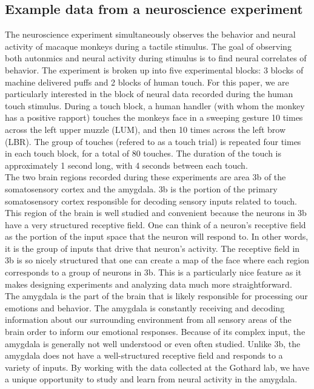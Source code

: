 \documentclass[12pt]{article}
\begin{document}
\subsection{Example data from a neuroscience experiment}The neuroscience experiment simultaneously observes the behavior and neural activity of macaque monkeys during a tactile stimulus. The goal of observing both autonmics and neural activity during stimulus is to find neural correlates of behavior. The experiment is broken up into five experimental blocks: 3 blocks of machine delivered puffs and 2 blocks of human touch. For this paper, we are particularly interested in the block of neural data recorded during the human touch stimulus. During a touch block, a human handler (with whom the monkey has a positive rapport) touches the monkeys face in a sweeping gesture 10 times across the left upper muzzle (LUM), and then 10 times across the left brow (LBR). The group of touches (refered to as a touch trial) is repeated four times in each touch block, for a total of 80 touches. The duration of the touch is approximately 1 second long, with 4 seconds between each touch.  \\
\indent The two brain regions recorded during these experiments are area 3b of the somatosensory cortex and the amygdala. 3b is the  portion of the primary somatosensory cortex responsible for decoding sensory inputs related to touch. This region of the brain is well studied and convenient because the neurons in 3b have a very structured receptive field. One can think of a neuron's receptive field as the portion of the input space that the neuron will respond to. In other words, it is the group of inputs that drive that neuron's activity. The receptive field in 3b is so nicely structured that one can create a map of the face where each region corresponds to a group of neurons in 3b. This is a particularly nice feature as it makes designing experiments and analyzing data much more straightforward. \\
\indent The amygdala is the part of the brain that is likely responsible for processing our
emotions and behavior. The amygdala is
constantly receiving and decoding information about our surrounding environment from all sensory areas of the brain
order to inform our emotional responses. Because of its complex input, the amygdala is generally not well understood or even often studied. Unlike 3b, the amygdala does not have a well-structured receptive field and responds to a variety of inputs. By working with the data collected at the Gothard lab, we have a unique opportunity to study and learn from neural activity in the amygdala. \\
\end{document}
